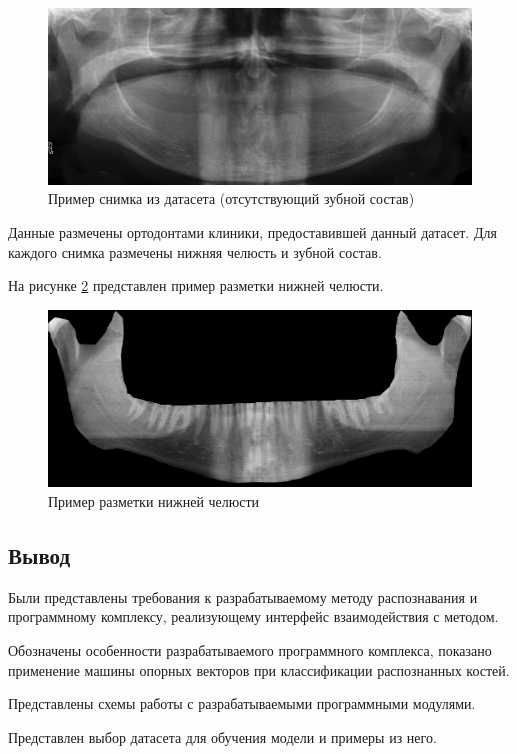 \begin{figure}[H]
	\centering
	\includegraphics[width=\textwidth]{img/example_teethless.png}
	\caption{Пример снимка из датасета (отсутствующий зубной состав)}
	\label{fig:example_teethless}
\end{figure}

Данные размечены ортодонтами клиники, предоставившей данный датасет. Для каждого снимка размечены нижняя челюсть и зубной состав.

На рисунке \ref{fig:example_mandible} представлен пример разметки нижней челюсти.

\begin{figure}[H]
	\centering
	\includegraphics[width=\textwidth]{img/example_mandible.png}
	\caption{Пример разметки нижней челюсти}
	\label{fig:example_mandible}
\end{figure}

\subsection*{Вывод}

Были представлены требования к разрабатываемому методу распознавания и программному комплексу, реализующему интерфейс взаимодействия с методом.

Обозначены особенности разрабатываемого программного комплекса, показано применение машины опорных векторов при классификации распознанных костей.

Представлены схемы работы с разрабатываемыми программными модулями.

Представлен выбор датасета для обучения модели и примеры из него.